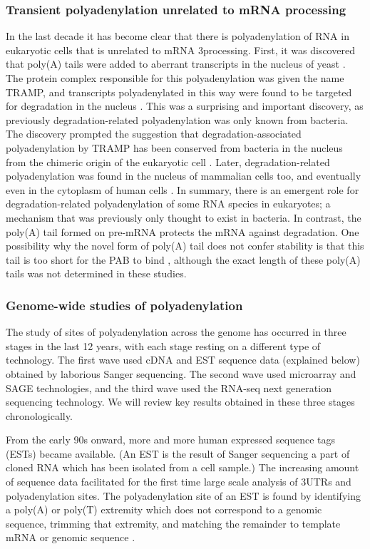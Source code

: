 \subsubsection{Transient polyadenylation unrelated to mRNA processing}
In the last decade it has become clear that there is polyadenylation of RNA in
eukaryotic cells that is unrelated to mRNA 3\p processing. First, it was
discovered that poly(A) tails were added to aberrant transcripts in the nucleus
of yeast \cite{wyers_cryptic_2005}. The protein complex responsible for this
polyadenylation was given the name TRAMP, and transcripts polyadenylated in
this way were found to be targeted for degradation in the nucleus
\cite{lacava_rna_2005, wyers_cryptic_2005}. This was a surprising and important
discovery, as previously degradation-related polyadenylation was only known
from bacteria. The discovery prompted the suggestion that
degradation-associated polyadenylation by TRAMP has been conserved from
bacteria in the nucleus from the chimeric origin of the eukaryotic cell
\cite{lacava_rna_2005}. Later, degradation-related polyadenylation was found in
the nucleus of mammalian cells too, and eventually even in the cytoplasm of
human cells \cite{slomovic_polyadenylation_2006, slomovic_addition_2010}. In
summary, there is an emergent role for degradation-related polyadenylation of
some RNA species in eukaryotes; a mechanism that was previously only thought to
exist in bacteria. In contrast, the poly(A) tail formed on pre-mRNA protects
the mRNA against degradation. One possibility why the novel form of poly(A)
tail does not confer stability is that this tail is too short for the PAB to
bind \cite{lacava_rna_2005}, although the exact length of these poly(A) tails
was not determined in these studies.

\subsubsection{Genome-wide studies of polyadenylation}
The study of sites of polyadenylation across the genome has occurred in three
stages in the last 12 years, with each stage resting on a different type of
technology. The first wave used cDNA and EST sequence data (explained below)
obtained by laborious Sanger sequencing. The second wave used microarray and
SAGE technologies, and the third wave used the RNA-seq next generation
sequencing technology. We will review key results obtained in these three
stages chronologically.

From the early 90s onward, more and more human expressed sequence tags (ESTs)
became available. (An EST is the result of Sanger sequencing a part of cloned
RNA which has been isolated from a cell sample.) The increasing amount of
sequence data facilitated for the first time large scale analysis of 3\p UTRs
and polyadenylation sites.  The polyadenylation site of an EST is found by
identifying a poly(A) or poly(T) extremity which does not correspond to a
genomic sequence, trimming that extremity, and matching the remainder to
template mRNA or genomic sequence \cite{beaudoing_patterns_2000,
tian_large-scale_2005}.

